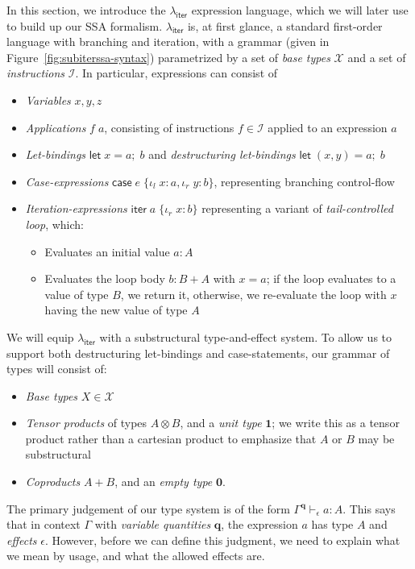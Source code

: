 \documentclass[acmsmall,screen,review]{acmart}
\newcommand{\mc}[1]{\ensuremath{\mathcal{#1}}}
\newcommand{\mb}[1]{\ensuremath{\mathbf{#1}}}
\newcommand{\ms}[1]{\ensuremath{\mathsf{#1}}}
\newcommand{\lto}{:}
\newcommand{\linl}[1]{\iota_l\;{#1}}
\newcommand{\linr}[1]{\iota_r\;{#1}}
\newcommand{\letexpr}[3]{\ensuremath{\ms{let}\;#1 = #2;\;#3}}
\newcommand{\caseexpr}[5]{\ms{case}\;#1\;\{\linl{#2} \lto #3, \linr{#4} \lto #5\}}
\newcommand{\liter}[3]{\ms{iter}\;#1\;\{ \linr{#2} \lto #3 \}}
\newcommand{\hasty}[4]{#1 \vdash_{#2} #3: {#4}}
\newcommand{\subiterssa}{\(\lambda_{\ms{iter}}\)}
\begin{document}
In this section, we introduce the \subiterssa{} expression language, which we will later use to
build up our SSA formalism. \subiterssa{} is, at first glance, a standard first-order language with
branching and iteration, with a grammar (given in Figure~\ref{fig:subiterssa-syntax})  parametrized
by a set of \emph{base types} $\mc{X}$ and a set of \emph{instructions} $\mc{I}$. In particular,
expressions can consist of
\begin{itemize}
  \item \emph{Variables} $x, y, z$
  \item \emph{Applications} $f\;a$, consisting of instructions $f \in \mc{I}$ applied to an
  expression $a$
  \item \emph{Let-bindings} $\letexpr{x}{a}{b}$ and \emph{destructuring let-bindings} $\letexpr{(x,
  y)}{a}{b}$
  \item \emph{Case-expressions} $\caseexpr{e}{x}{a}{y}{b}$, representing branching control-flow
  \item \emph{Iteration-expressions} $\liter{a}{x}{b}$ representing a variant of
  \emph{tail-controlled loop}, which:
  \begin{itemize}
    \item Evaluates an initial value $a : A$
    \item Evaluates the loop body $b : B + A$ with $x = a$; if the loop evaluates to a value of type
    $B$, we return it, otherwise, we re-evaluate the loop with $x$ having the new value of type $A$
  \end{itemize}
\end{itemize}

We will equip \subiterssa{} with a substructural type-and-effect system. To allow us to support both destructuring let-bindings and case-statements, our grammar of types will consist of:
\begin{itemize}
  \item \emph{Base types} $X \in \mc{X}$
  \item \emph{Tensor products} of types $A \otimes B$, and a \emph{unit type} $\mb{1}$; we write
  this as a tensor product rather than a cartesian product to emphasize that $A$ or $B$ may be
  substructural
  \item \emph{Coproducts} $A + B$, and an \emph{empty type} $\mb{0}$.
\end{itemize}
The primary judgement of our type system is of the form $\hasty{\Gamma^{\mb{q}}}{\epsilon}{a}{A}$.
This says that in context $\Gamma$ with \emph{variable quantities} $\mb{q}$, the expression $a$ has
type $A$ and \emph{effects} $\epsilon$. However, before we can define this judgment, we need to
explain what we mean by usage, and what the allowed effects are. 
\end{document}
